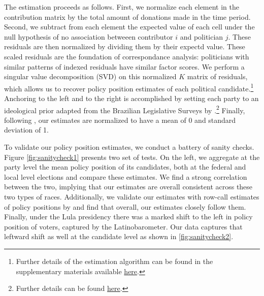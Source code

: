 \documentclass[12pt,english]{article}
\newcommand{\lyxdot}{.}
\numberwithin{equation}{section}
\theoremstyle{plain}
\theoremstyle{remark}
\theoremstyle{plain}
\begin{document}
The estimation proceeds as follows. First, we normalize each element in the contribution matrix by the total amount of donations made in the time period. Second, we subtract from each element the expected value of each cell under the null hypothesis of no association betweeen contributor $i$ and politician $j$. These residuals are then normalized by dividing them by their expectd value. These scaled residuals are the foundation of correspondance analysis: politicians with similar patterns of indexed residuals have similar factor scores. We perform a singular value decomposition (SVD) on this normalized $K$ matrix of residuals, which allows us to recover policy position estimates of each political candidate.\footnote{Further details of the estimation algorithm can be found in the supplementary materials available \href{https://onlinelibrary.wiley.com/doi/abs/10.1111/ajps.12062}{here}.} Anchoring to the left and to the right is accomplished by setting each party to an ideological prior adapted from the Brazilian Legislative Surveys by .\footnote{Further details can be found \href{https://dataverse.harvard.edu/dataset.xhtml?persistentId=doi:10.7910/DVN/8USPML}{here}.} Finally, following , our estimates are normalized to have a mean of 0 and standard deviation of 1.

To validate our policy position estimates, we conduct a battery of sanity checks. Figure \ref{fig:sanitycheck1} presents two set of tests. On the left, we aggregate at the party level the mean policy position of its candidates, both at the federal and local level elections and compare these estimates. We find a strong correlation between the two, implying that our estimates are overall consistent across these two types of races. Additionally, we validate our estimates with row-call estimates of policy positions by  and find that overall, our estimates closely follow them. Finally, under the Lula presidency there was a marked shift to the left in policy position of voters, captured by the Latinobarometer. Our data captures that leftward shift as well at the candidate level as shown in \ref{fig:sanitycheck2}.

\end{document}
